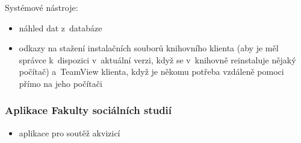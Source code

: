 \documentclass[
	11pt, oneside, printed, final, palatino, monochrome
	microtype,
	table,   %
	lof,     %
	lot     %
]{fithesis3}
\begin{document}
{Systémové nástroje:

\begin{itemize}
\item náhled dat z~databáze
\item odkazy na stažení instalačních souborů knihovního klienta (aby je měl správce k~dispozici v~aktuální verzi, když se v~knihovně reinstaluje nějaký počítač) a~TeamView klienta, když je někomu potřeba vzdáleně pomoci přímo na jeho počítači
\end{itemize}

\subsubsection{Aplikace Fakulty sociálních studií}

\begin{itemize}
\item aplikace pro soutěž akvizicí
\end{itemize}

}
\end{document}
